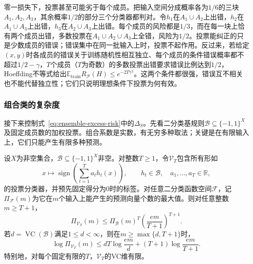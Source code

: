 零一损失下，投票甚至可能劣于每个成员。把输入空间分成概率各为$1/6$的三块$A_1,A_2,A_3$，其余概率$1/2$的部分三个分类器都判对。令$h_1$在$A_1\cup A_2$上出错，$h_2$在$A_1\cup A_3$上出错，$h_3$在$A_2\cup A_3$上出错。每个成员的风险都是$1/3$，而在每一块上恰有两个成员出错，多数投票在$A_1\cup A_2\cup A_3$上全错，风险为$1/2$。投票能纠正的只是少数成员的错误；错误集中在同一批输入上时，投票不起作用。反过来，若给定$(x,y)$时各成员的错误关于训练随机性相互独立、每个成员的条件错误概率都不超过$1/2-\gamma$，$T$个成员（$T$为奇数）的多数投票出错要求错误比例达到$1/2$，Hoeffding不等式给出$\mathbb E_{\mathrm{train}}R_{\mathcal P}(H)\leq e^{-2T\gamma^2}$。这两个条件都很强，错误互不相关也不能代替独立性；它们只说明理想条件下投票为何有效。

\subsubsection{组合类的复杂度}

接下来控制式~\eqref{eq:ensemble-excess-risk}中的$\Delta_S$。先看二分类基规则$\mathcal B\subseteq\{-1,1\}^X$及固定成员数的加权投票。组合系数是实数，有无穷多种取法；关键是在有限输入上，它们只能产生有限多种预测。

\begin{theorem}[投票假设空间的生长函数]
\label{thm:vote-growth-infinite}
设$X$为非空集合，$\mathcal B\subseteq\{-1,1\}^X$非空。对整数$T\geq1$，令$\mathcal V_T$包含所有形如
\[
 x\mapsto\operatorname{sign}\!\left(\sum_{t=1}^T a_t h_t(x)\right),
 \qquad h_t\in\mathcal B,\quad a_1,\ldots,a_T\in\mathbb R,
\]
的投票分类器，并预先固定得分为0时的标签。对任意二分类函数空间$\mathcal F$，记$\Pi_{\mathcal F}(m)$为它在$m$个输入上能产生的预测向量个数的最大值。则对任意整数$m\geq T+1$，
\begin{equation}
 \Pi_{\mathcal V_T}(m)
 \leq\Pi_{\mathcal B}(m)^T
       \left(\frac{em}{T+1}\right)^{T+1}.
 \label{eq:boosting-vote-growth}
\end{equation}
若$d=\operatorname{VC}(\mathcal B)$满足$1\leq d<\infty$，则在$m\geq\max\{d,T+1\}$时，
\begin{equation}
 \log\Pi_{\mathcal V_T}(m)
 \leq dT\log\frac{em}{d}+(T+1)\log\frac{em}{T+1}.
 \label{eq:infinite-boosting-growth}
\end{equation}
特别地，对每个固定有限的$T$，$\mathcal V_T$的VC维有限。
\end{theorem}

